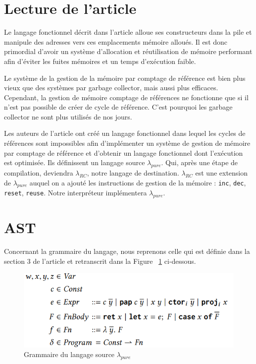 \documentclass{rapportECL}
\begin{document}
\section{Lecture de l'article}
Le langage fonctionnel décrit dans l'article\cite{ullrich_counting_2020} alloue ses constructeurs dans la pile et manipule des 
adresses vers ces emplacements mémoire alloués. Il est donc primordial d'avoir un système d'allocation et réutilisation de 
mémoire performant afin d'éviter les fuites mémoires et un temps d'exécution faible.

Le système de la gestion de la mémoire par comptage de référence est bien plus vieux que des systèmes par garbage collector, 
mais aussi plus efficaces\cite{ullrich_counting_2020}. Cependant, la gestion de mémoire comptage de références ne fonctionne que si 
il n'est pas possible de créer de cycle de référence. 
C'est pourquoi les garbage collector ne sont plus utilisés de nos jours.

Les auteurs de l'article\cite{ullrich_counting_2020} ont créé un langage fonctionnel dans lequel les cycles de références 
sont impossibles afin d'implémenter un système de gestion de mémoire par comptage de référence et d'obtenir un langage fonctionnel 
dont l'exécution est optimisée. Ils définissent un langage source $\lambda_{pure}$. 
Qui, après une étape de compilation, deviendra $\lambda_{RC}$, notre langage de destination.
$\lambda_{RC}$ est une extension de $\lambda_{pure}$ auquel on a ajouté les instructions de gestion de la mémoire : 
\verb|inc|, \verb|dec|, \verb|reset|, \verb|reuse|.
Notre interpréteur implémentera $\lambda_{pure}$.


\section{AST}

Concernant la grammaire du langage, nous reprenons celle qui est définie dans la section 3 de l'article et retranscrit dans la Figure ~\ref{fig:grammaire pure} ci-dessous.

\begin{figure}[hbt!]
	\centering
	\includegraphics[scale=0.65]{logos/grammaire.png}
	\caption{Grammaire du langage source $\lambda_{pure}$}
	\label{fig:grammaire pure}
\end{figure}
\FloatBarrier
\end{document}
